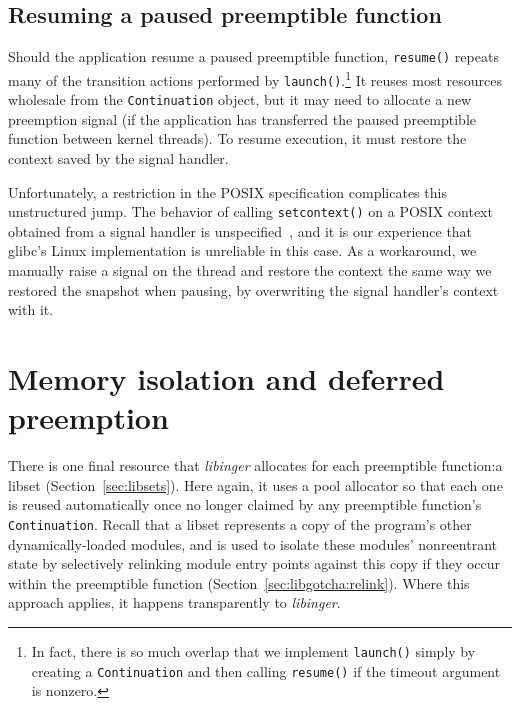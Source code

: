 \subsection{Resuming a paused preemptible function}

Should the application resume a paused preemptible function, \texttt{resume()}
repeats many of the transition actions performed by \texttt{launch()}.\footnote{In
fact, there is so much overlap that we implement \texttt{launch()} simply by creating
a \texttt{Continuation} and then calling \texttt{resume()} if the timeout argument is
nonzero.}  It reuses most resources wholesale from the \texttt{Continuation} object,
but it may need to allocate a new preemption signal (if the application has
transferred the paused preemptible function between kernel threads).  To resume
execution, it must restore the context saved by the signal handler.

Unfortunately, a restriction in the POSIX specification complicates this unstructured
jump.  The behavior of calling \texttt{setcontext()} on a POSIX context obtained from
a signal handler is unspecified~\cite{getcontext-manpage}, and it is our experience
that glibc's Linux implementation is unreliable in this case.  As a workaround, we
manually raise a signal on the thread and restore the context the same way we
restored the snapshot when pausing, by overwriting the signal handler's context with
it.


\section{Memory isolation and deferred preemption}
\label{sec:libinger:isolation}

There is one final resource that \textit{libinger} allocates for each preemptible
function:\@ a libset (Section~\ref{sec:libsets}).  Here again, it uses a pool
allocator so that each one is reused automatically once no longer claimed by any
preemptible function's \texttt{Continuation}.  Recall that a libset represents a copy
of the program's other dynamically-loaded modules, and is used to isolate these
modules' nonreentrant state by selectively relinking module entry points against this
copy if they occur within the preemptible function
(Section~\ref{sec:libgotcha:relink}).  Where this approach applies, it happens
transparently to \textit{libinger}.

